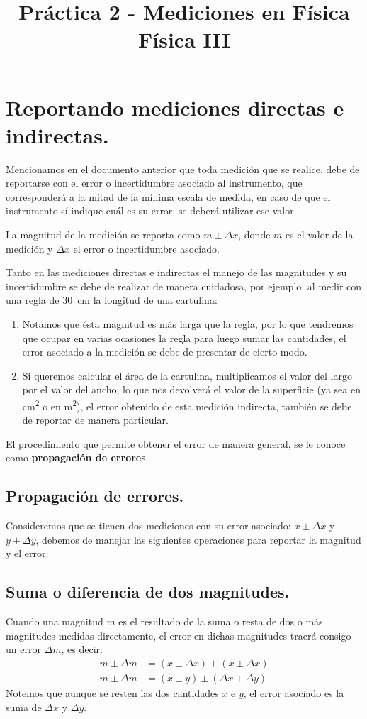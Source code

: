 \documentclass[14pt]{extarticle}
\title{\vspace*{-2cm} Práctica 2 - Mediciones en Física \\  Física III \vspace{-5ex}}
\date{}
\begin{document}
\maketitle

\section{Reportando mediciones directas e indirectas. }

Mencionamos en el documento anterior que toda medición que se realice, debe de reportarse con el error o incertidumbre asociado al instrumento, que corresponderá a la mitad de la mínima escala de medida, en caso de que el instrumento sí indique cuál es su error, se deberá utilizar ese valor.

La magnitud de la medición se reporta como $m \pm \Delta x$, donde $m$ es el valor de la medición y $\Delta x$ el error o incertidumbre asociado.

Tanto en las mediciones directas e indirectas el manejo de las magnitudes y su incertidumbre se debe de realizar de manera cuidadosa, por ejemplo, al medir con una regla de \SI{30}{\centi\meter} la longitud de una cartulina:
\begin{enumerate}
\item Notamos que ésta magnitud es más larga que la regla, por lo que tendremos que ocupar en varias ocasiones la regla para luego sumar las cantidades, el error asociado a la medición se debe de presentar de cierto modo. 
\item Si queremos calcular el área de la cartulina, multiplicamos el valor del largo por el valor del ancho, lo que nos devolverá el valor de la superficie (ya sea en \unit{\square\centi\meter} o en \unit{\square\meter}), el error obtenido de esta medición indirecta, también se debe de reportar de manera particular.
\end{enumerate}
El procedimiento que permite obtener el error de manera general, se le conoce como \textbf{propagación de errores}.

\subsection{Propagación de errores.}

Consideremos que se tienen dos mediciones con su error asociado: $x \pm \Delta x$ y $y \pm \Delta y$, debemos de manejar las siguientes operaciones para reportar la magnitud y el error:

\subsection*{Suma o diferencia de dos magnitudes.}

Cuando una magnitud $m$ es el resultado de la suma o resta de dos o más magnitudes medidas directamente, el error en dichas magnitudes traerá consigo un error $\Delta m$, es decir:
\begin{align*}
m \pm \Delta m &= (x \pm \Delta x) + (x \pm \Delta x) \\[0.5em]
m \pm \Delta m &= (x \pm y) \pm (\Delta x + \Delta y)
\end{align*}
Notemos que aunque se resten las dos cantidades $x$ e $y$, el error asociado es la suma de $\Delta x$ y $\Delta y$.
\end{document}
